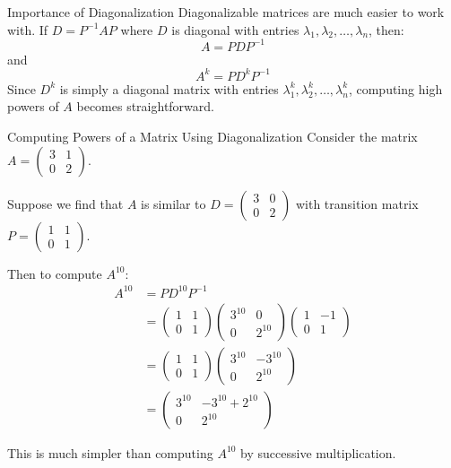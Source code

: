\documentclass[12pt,a4paper]{article}
\begin{document}
	\begin{remark}{Importance of Diagonalization}
		Diagonalizable matrices are much easier to work with. If $D = P^{-1}AP$ where $D$ is diagonal with entries $\lambda_1, \lambda_2, \ldots, \lambda_n$, then:
		\[
		A = PDP^{-1}
		\]
		and
		\[
		A^k = PD^kP^{-1}
		\]
		Since $D^k$ is simply a diagonal matrix with entries $\lambda_1^k, \lambda_2^k, \ldots, \lambda_n^k$, computing high powers of $A$ becomes straightforward.
	\end{remark}
	
	\begin{example}{Computing Powers of a Matrix Using Diagonalization}
		Consider the matrix $A = \begin{pmatrix} 3 & 1 \\ 0 & 2 \end{pmatrix}$.
		
		Suppose we find that $A$ is similar to $D = \begin{pmatrix} 3 & 0 \\ 0 & 2 \end{pmatrix}$ with transition matrix $P = \begin{pmatrix} 1 & 1 \\ 0 & 1 \end{pmatrix}$.
		
		Then to compute $A^{10}$:
		\begin{align*}
			A^{10} &= PD^{10}P^{-1} \\
			&= \begin{pmatrix} 1 & 1 \\ 0 & 1 \end{pmatrix} \begin{pmatrix} 3^{10} & 0 \\ 0 & 2^{10} \end{pmatrix} \begin{pmatrix} 1 & -1 \\ 0 & 1 \end{pmatrix} \\
			&= \begin{pmatrix} 1 & 1 \\ 0 & 1 \end{pmatrix} \begin{pmatrix} 3^{10} & -3^{10} \\ 0 & 2^{10} \end{pmatrix} \\
			&= \begin{pmatrix} 3^{10} & -3^{10} + 2^{10} \\ 0 & 2^{10} \end{pmatrix}
		\end{align*}
		
		This is much simpler than computing $A^{10}$ by successive multiplication.
	\end{example}
	
\end{document}
